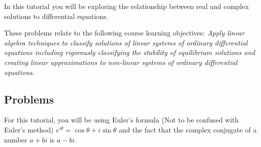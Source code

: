 		\begin{objectives}
	In this tutorial you will be exploring the relationship between real and complex solutions to differential equations.

	These problems relate to the following course learning objectives:
			\textit{
				Apply linear algebra techniques to classify solutions of linear systems of ordinary differential
equations including rigorously classifying the stability of equilibrium solutions and creating
linear approximations to non-linear systems of ordinary differential equations}.
		\end{objectives}


\subsection*{Problems}

For this tutorial, you will be using Euler's formula (Not to be confused with Euler's method)
$
	e^{i\theta}=\cos \theta + i\sin \theta
$ and the fact that the complex conjugate of a number $a+bi$ is $a-bi$.


